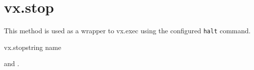 \section{vx.stop}

This method is used as a wrapper to vx.exec using the configured \texttt{halt}
command.

\begin{rpcsynopsis}{vx.stop}{string name}
\end{rpcsynopsis}

\begin{rpcaccess}
 and \rpcownerchecks.
\end{rpcaccess}


\begin{rpcerrors}
\end{rpcerrors}
